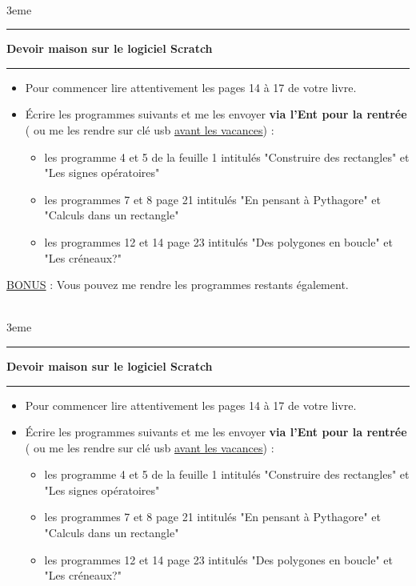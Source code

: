 \documentclass[a4paper,11pt]{article}
\newcommand{\bi}{\begin{itemize}}
\newcommand{\ei}{\end{itemize}}
\newcommand{\titre}[5] 
{
\noindent #2 \hfill #4 \\
#3 \hfill #5

\vspace{-1.6cm}

\begin{center}\rule{6cm}{0.5mm}\end{center}
\vspace{0.2cm}
\begin{center}{\large{\textbf{#1}}}\end{center}
\begin{center}\rule{6cm}{0.5mm}\end{center}
}
\begin{document}
\pagestyle{empty}
\titre{Devoir maison sur le logiciel Scratch}{}{}{}{3eme}


\bi

\item Pour commencer lire attentivement les pages 14 à 17 de votre livre.\\

\item Écrire les programmes suivants et me les envoyer \textbf{via l'Ent pour la rentrée} ( ou me les rendre sur clé usb \underline{avant les vacances}) :\\

\begin{itemize}[label=\textbullet]
\item les programme 4 et 5 de la feuille 1 intitulés "Construire des rectangles" et "Les signes opératoires"

\item les programmes 7 et 8 page 21 intitulés "En pensant à Pythagore" et "Calculs dans un rectangle"

\item les programmes 12 et 14 page 23 intitulés "Des polygones en boucle" et "Les créneaux?"\\

\end{itemize}
\ei

\underline{BONUS} : Vous pouvez me rendre les programmes restants également.

\vspace*{3cm}


\titre{Devoir maison sur le logiciel Scratch}{}{}{}{3eme}


\bi

\item Pour commencer lire attentivement les pages 14 à 17 de votre livre.\\

\item Écrire les programmes suivants et me les envoyer \textbf{via l'Ent pour la rentrée} ( ou me les rendre sur clé usb \underline{avant les vacances}) :\\

\begin{itemize}[label=\textbullet]
\item les programme 4 et 5 de la feuille 1 intitulés "Construire des rectangles" et "Les signes opératoires"

\item les programmes 7 et 8 page 21 intitulés "En pensant à Pythagore" et "Calculs dans un rectangle"

\item les programmes 12 et 14 page 23 intitulés "Des polygones en boucle" et "Les créneaux?"\\

\end{itemize}
\ei
\end{document}

